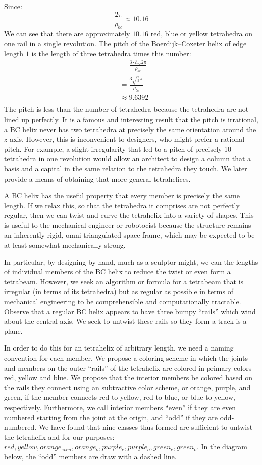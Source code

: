 \documentclass[11pt]{article}
\begin{document}
Since:
\[ \frac{2 \pi}{\rho_{bc}} \approx 10.16
\]
We can see that there are approximately $10.16$ red, blue or yellow tetrahedra on one rail in a single revolution.
The pitch of the Boerdijk--Coxeter helix of edge length $1$ is the length of three tetrahedra times this number:
\begin{align*}
  &= \frac{3 \cdot h_{bc} 2 \pi }{\rho_{bc}} \\
  &= \frac{3  \sqrt{\frac{2}{5}}  \pi}{\rho_{bc}} \\
  &\approx 9.6392 \\
\end{align*}
The pitch is less than the number of tetrahedra because the tetrahedra are not lined up perfectly.
It is a famous and interesting result that the pitch is irrational, a BC helix never has two tetrahedra
at precisely the same orientation around the $z$-axis. However, this is inconvenient to designers, who
might prefer a rational pitch. For example, a slight irregularity that led to a pitch of precisely 10 tetrahedra
in one revolution would allow an architect to design a column that a basis and a capital in the same relation to the tetrahedra
they touch.
We later provide a means of obtaining that more general tetrahelices.

A BC helix has the useful property that every member is precisely the same length. If we relax this, so that the tetrahedra it
comprises are not perfectly regular, then we can twist and curve the tetrahelix into a variety of shapes. This is useful to
the mechanical engineer or robotocist because the structure remains an inherently rigid, omni-triangulated space frame, which
may be expected to be at least somewhat mechanically strong.

In particular, by designing by hand, much as a sculptor might, we can the lengths of individual members of the BC helix to reduce the
twist or even form a tetrabeam.
However, we seek an algorithm or formula for a tetrabeam that is irregular
(in terms of its tetrahedra) but as regular as possible in terms of mechanical engineering to be comprehensible and computationally tractable.
Observe that a regular BC helix appears to have three bumpy ``rails'' which wind about the central axis.  We seek to untwist
these rails so they form a track is a plane.

In order to do this for an tetrahelix of arbitrary length, we need a naming convention for each member. We propose a coloring
scheme in which the joints and members on the outer ``rails'' of the tetrahelix are colored in primary colors red, yellow and blue.
We propose that the interior members be colored based on the rails they connect using an subtractive color scheme, or orange, purple, and green,
if the member connects red to yellow, red to blue, or blue to yellow, respectively.  Furthermore, we call interior members ``even'' if they
are even numbered starting from the joint at the origin, and ``odd'' if they are odd-numbered.  We have found that nine classes thus
formed are sufficient to untwist the tetrahelix and for our purposes: $red, yellow, orange_{even}, orange_o, purple_e, purple_o, green_e, green_o$.
In the diagram below, the ``odd'' members are draw with a dashed line.
\end{document}
